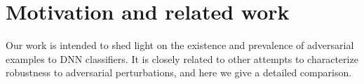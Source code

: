 \section{Motivation and related work}
Our work is intended to shed light on the existence and prevalence of adversarial examples to DNN classifiers. It is closely related to other attempts to characterize robustness to adversarial perturbations, and here we give a detailed comparison.






